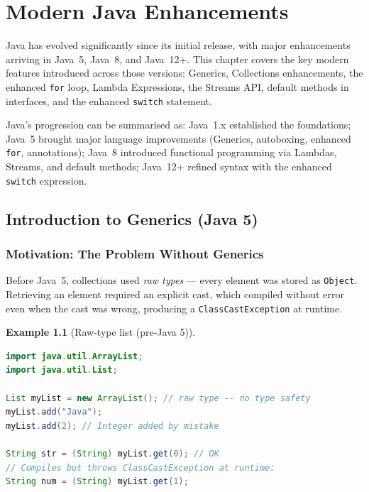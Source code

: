 \documentclass[11pt, a4paper, notitlepage]{report}
\theoremstyle{definition}
\theoremstyle{remark}
\theoremstyle{definition}
\newtheorem{example}[theorem]{Example}
\begin{document}
\chapter{Modern Java Enhancements}
\label{ch:ch10-modern-java}

Java has evolved significantly since its initial release, with major enhancements arriving in
Java~5, Java~8, and Java~12+.  This chapter covers the key modern features introduced across
those versions: Generics, Collections enhancements, the enhanced \texttt{for} loop, Lambda
Expressions, the Streams API, default methods in interfaces, and the enhanced \texttt{switch}
statement.

Java's progression can be summarised as: Java~1.x established the foundations; Java~5 brought
major language improvements (Generics, autoboxing, enhanced \texttt{for}, annotations); Java~8
introduced functional programming via Lambdas, Streams, and default methods; Java~12+ refined
syntax with the enhanced \texttt{switch} expression.

\section{Introduction to Generics (Java 5)}
\label{sec:ch10-generics}

\subsection{Motivation: The Problem Without Generics}
\label{subsec:ch10-no-generics}

Before Java~5, collections used \emph{raw types} — every element was stored as
\texttt{Object}.  Retrieving an element required an explicit cast, which compiled
without error even when the cast was wrong, producing a \texttt{ClassCastException}
at runtime.

\begin{example}[Raw-type list (pre-Java 5)]
\leavevmode
\begin{lstlisting}[language=Java]
import java.util.ArrayList;
import java.util.List;

List myList = new ArrayList(); // raw type -- no type safety
myList.add("Java");
myList.add(2); // Integer added by mistake

String str = (String) myList.get(0); // OK
// Compiles but throws ClassCastException at runtime:
String num = (String) myList.get(1);
\end{lstlisting}
\end{example}
\end{document}
